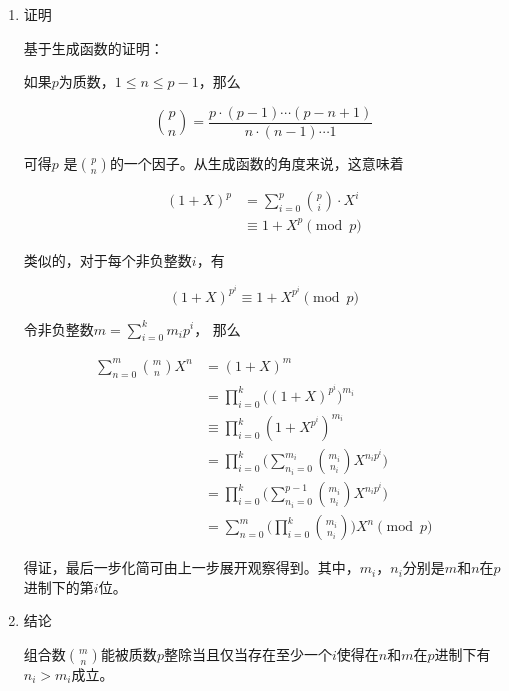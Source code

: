 \documentclass[11pt]{article}
\begin{document}
\begin{enumerate}
\item 证明
\label{sec-1-1-3-1}

基于生成函数的证明：

如果\(p\)为质数，\(1\leq n \leq p-1\)，那么

$$
\binom{p}{n} = \frac{p \cdot (p - 1) \cdots (p - n + 1)}{n \cdot (n - 1) \cdots 1}
$$

可得\(p\) 是\(\binom{p}{n}\)的一个因子。从生成函数的角度来说，这意味着

$$
\begin{aligned}
(1 + X)^p &= \sum_{i=0}^p \binom{p}{i}\cdot X^i\\
&\equiv 1+X^p \pmod p
\end{aligned}
$$

类似的，对于每个非负整数\(i\)，有

$$
(1+X)^{p^i} \equiv 1 + X^{p^i} \pmod p
$$

令非负整数\(m=\sum_{i=0}^k m_i p^i\)， 那么

$$
\begin{aligned}
\sum_{n=0}^m \binom{m}{n}X^n &= (1 + X)^m \\
&=\prod_ {i=0}^k \Big ((1+X)^{p^i} \Big) ^{m_i}\\
&\equiv \prod_{i=0}^k(1+X^{p^i})^{m_i}\\
&=\prod_{i=0}^k\bigg ( \sum_{n_i=0}^{m_i} \binom{m_i}{n_i}X^{n_i p^i} \bigg)\\
&=\prod_{i=0}^k \bigg (\sum_{n_i=0}^{p-1} \binom{m_i}{n_i}X^{n_ip^i} \bigg)\\
&=\sum_{n=0}^m \bigg(\prod_{i=0}^k \binom{m_i}{n_i} \bigg) X^n \pmod p
\end{aligned}
$$

得证，最后一步化简可由上一步展开观察得到。其中，\(m_i\)，\(n_i\)分别是\(m\)和\(n\)在\(p\)进制下的第\(i\)位。

\item 结论
\label{sec-1-1-3-2}

组合数\(\binom{m}{n}\)能被质数\(p\)整除当且仅当存在至少一个\(i\)使得在\(n\)和\(m\)在\(p\)进制下有\(n_i > m_i\)成立。
\end{enumerate}
\end{document}
